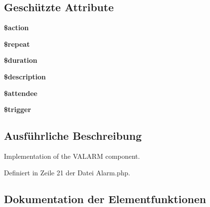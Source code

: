 \subsection*{Geschützte Attribute}
\begin{DoxyCompactItemize}
\item 
\mbox{\label{class_eluceo_1_1i_cal_1_1_component_1_1_alarm_a27c305d6ce45519ae847846075ed74b4}} 
{\bfseries \$action}
\item 
\mbox{\label{class_eluceo_1_1i_cal_1_1_component_1_1_alarm_a697f28eecd9508c17568883a78b23de9}} 
{\bfseries \$repeat}
\item 
\mbox{\label{class_eluceo_1_1i_cal_1_1_component_1_1_alarm_adf354c492648f533266a500229bb1edd}} 
{\bfseries \$duration}
\item 
\mbox{\label{class_eluceo_1_1i_cal_1_1_component_1_1_alarm_a2d5a394f8015ecc146a3f31b33dd9739}} 
{\bfseries \$description}
\item 
\mbox{\label{class_eluceo_1_1i_cal_1_1_component_1_1_alarm_a03b3492ed98f56489201402360df2706}} 
{\bfseries \$attendee}
\item 
\mbox{\label{class_eluceo_1_1i_cal_1_1_component_1_1_alarm_ab2786dca320800b21d076eb36e75dd28}} 
{\bfseries \$trigger}
\end{DoxyCompactItemize}


\subsection{Ausführliche Beschreibung}
Implementation of the V\+A\+L\+A\+RM component. 

Definiert in Zeile 21 der Datei Alarm.\+php.



\subsection{Dokumentation der Elementfunktionen}
\mbox{\label{class_eluceo_1_1i_cal_1_1_component_1_1_alarm_a686e825a428bca61a7161f305b0c1bad}} 
